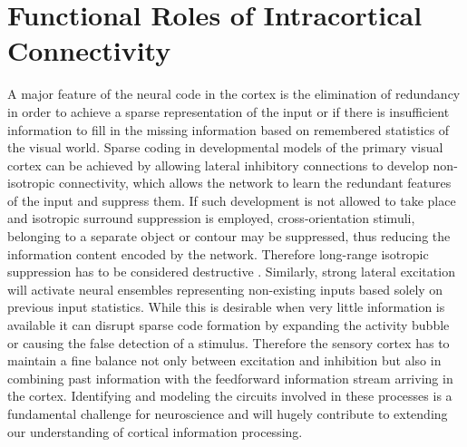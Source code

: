 \section{Functional Roles of Intracortical Connectivity}

A major feature of the neural code in the cortex is the elimination of
redundancy in order to achieve a sparse representation of the input or
if there is insufficient information to fill in the missing
information based on remembered statistics of the visual world. Sparse
coding in developmental models of the primary visual cortex can be
achieved by allowing lateral inhibitory connections to develop
non-isotropic connectivity, which allows the network to learn the
redundant features of the input and suppress them. If such development
is not allowed to take place and isotropic surround suppression is
employed, cross-orientation stimuli, belonging to a separate object or
contour may be suppressed, thus reducing the information content
encoded by the network. Therefore long-range isotropic suppression has
to be considered destructive \citep{Miikkulainen2005b}. Similarly,
strong lateral excitation will activate neural ensembles representing
non-existing inputs based solely on previous input statistics. While
this is desirable when very little information is available it can
disrupt sparse code formation by expanding the activity bubble or
causing the false detection of a stimulus. Therefore the sensory
cortex has to maintain a fine balance not only between excitation and
inhibition but also in combining past information with the feedforward
information stream arriving in the cortex. Identifying and modeling
the circuits involved in these processes is a fundamental challenge
for neuroscience and will hugely contribute to extending our
understanding of cortical information processing.


